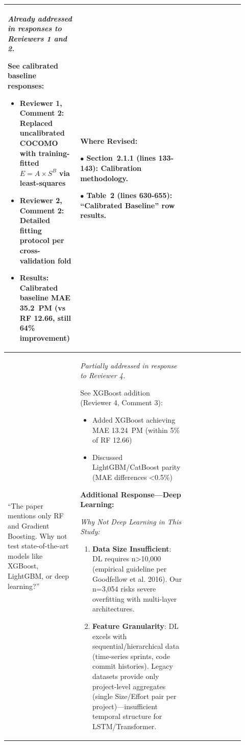 \documentclass[11pt,a4paper]{article}
\begin{document}
\begin{longtable}{>{\raggedright\arraybackslash}p{0.26\linewidth}|>{\raggedright\arraybackslash}p{0.44\linewidth}|>{\raggedright\arraybackslash}p{0.22\linewidth}}
\textit{Already addressed in responses to Reviewers 1 and 2.}

See calibrated baseline responses:
\begin{itemize}
    \item \textbf{Reviewer 1, Comment 2}: Replaced uncalibrated COCOMO with training-fitted $E = A \times S^B$ via least-squares
    \item \textbf{Reviewer 2, Comment 2}: Detailed fitting protocol per cross-validation fold
    \item \textbf{Results}: Calibrated baseline MAE 35.2~PM (vs RF 12.66, still 64\% improvement)
\end{itemize} &

\textbf{Where Revised:}

$\bullet$ \textbf{Section~2.1.1} (lines 133-143): Calibration methodology.

$\bullet$ \textbf{Table~2} (lines 630-655): ``Calibrated Baseline'' row results. \\

\midrule

``The paper mentions only RF and Gradient Boosting. Why not test state-of-the-art models like XGBoost, LightGBM, or deep learning?'' &

\textit{Partially addressed in response to Reviewer 4.}

See XGBoost addition (Reviewer 4, Comment 3):
\begin{itemize}
    \item Added XGBoost achieving MAE 13.24~PM (within 5\% of RF 12.66)
    \item Discussed LightGBM/CatBoost parity (MAE differences <0.5\%)
\end{itemize}

\textbf{Additional Response---Deep Learning:}

\textit{Why Not Deep Learning in This Study:}

\begin{enumerate}
    \item \textbf{Data Size Insufficient}: DL requires n>10,000 (empirical guideline per Goodfellow et al. 2016). Our n=3,054 risks severe overfitting with multi-layer architectures.
    
    \item \textbf{Feature Granularity}: DL excels with sequential/hierarchical data (time-series sprints, code commit histories). Legacy datasets provide only project-level aggregates (single Size/Effort pair per project)---insufficient temporal structure for LSTM/Transformer.
    

\end{enumerate}
\end{longtable}
\end{document}
